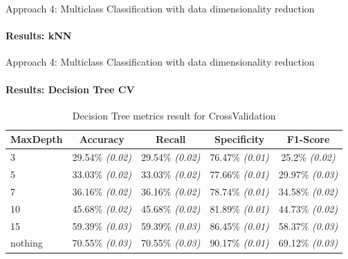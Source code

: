 \documentclass[9pt, pstricks, xcolor=dvipsnames]{beamer}
\begin{document}
\begin{frame}{Approach 4: Multiclass Classification with data dimensionality reduction}
\framesubtitle{Results: kNN}
\begin{table}[H]
\centering
{}
\caption{kNN metrics result}
\label{tab:kNN_approach4}
\end{table}
\end{frame}
\begin{frame}{Approach 4: Multiclass Classification with data dimensionality reduction}
\framesubtitle{Results: Decision Tree CV}
\begin{table}[H]
\centering
\begin{tabular}{lcccc}
\toprule
MaxDepth & Accuracy & Recall & Specificity & F1-Score \\
\midrule
3 & 29.54\% \textit{(0.02)} & 29.54\% \textit{(0.02)} & 76.47\% \textit{(0.01)} & 25.2\% \textit{(0.02)} \\
5 & 33.03\% \textit{(0.02)} & 33.03\% \textit{(0.02)} & 77.66\% \textit{(0.01)} & 29.97\% \textit{(0.03)} \\
7 & 36.16\% \textit{(0.02)} & 36.16\% \textit{(0.02)} & 78.74\% \textit{(0.01)} & 34.58\% \textit{(0.02)} \\
10 & 45.68\% \textit{(0.02)} & 45.68\% \textit{(0.02)} & 81.89\% \textit{(0.01)} & 44.73\% \textit{(0.02)} \\
15 & 59.39\% \textit{(0.03)} & 59.39\% \textit{(0.03)} & 86.45\% \textit{(0.01)} & 58.37\% \textit{(0.03)} \\
nothing & 70.55\% \textit{(0.03)} & 70.55\% \textit{(0.03)} & 90.17\% \textit{(0.01)} & 69.12\% \textit{(0.03)} \\
\bottomrule
\end{tabular}
\caption{Decision Tree metrics result for CrossValidation}
\label{tab:DT_CV_approach4}
\end{table}
\end{frame}
\end{document}
